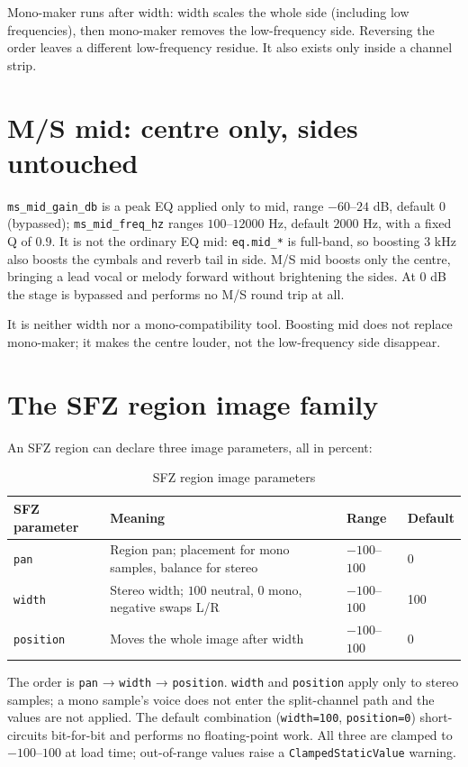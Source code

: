 Mono-maker runs after width: width scales the whole side (including low frequencies), then mono-maker removes the low-frequency side. Reversing the order leaves a different low-frequency residue. It also exists only inside a channel strip.

\section{M/S mid: centre only, sides untouched}

\texttt{ms\_mid\_gain\_db} is a peak EQ applied only to mid, range $-60$--$24$ dB, default $0$ (bypassed); \texttt{ms\_mid\_freq\_hz} ranges $100$--$12000$ Hz, default $2000$ Hz, with a fixed Q of $0.9$. It is not the ordinary EQ mid: \texttt{eq.mid\_*} is full-band, so boosting 3 kHz also boosts the cymbals and reverb tail in side. M/S mid boosts only the centre, bringing a lead vocal or melody forward without brightening the sides. At $0$ dB the stage is bypassed and performs no M/S round trip at all.

It is neither width nor a mono-compatibility tool. Boosting mid does not replace mono-maker; it makes the centre louder, not the low-frequency side disappear.

\section{The SFZ region image family}

An SFZ region can declare three image parameters, all in percent:

\begin{table}[htbp]
\centering
\small
\begin{tabular}{@{}llll@{}}
\hline
SFZ parameter & Meaning & Range & Default \\
\hline
\texttt{pan} & Region pan; placement for mono samples, balance for stereo & $-100$--$100$ & 0 \\
\texttt{width} & Stereo width; $100$ neutral, $0$ mono, negative swaps L/R & $-100$--$100$ & 100 \\
\texttt{position} & Moves the whole image after width & $-100$--$100$ & 0 \\
\hline
\end{tabular}
\caption{SFZ region image parameters}
\label{tab:sfz-pan-family}
\end{table}

The order is \texttt{pan} → \texttt{width} → \texttt{position}. \texttt{width} and \texttt{position} apply only to stereo samples; a mono sample's voice does not enter the split-channel path and the values are not applied. The default combination (\texttt{width=100}, \texttt{position=0}) short-circuits bit-for-bit and performs no floating-point work. All three are clamped to $-100$--$100$ at load time; out-of-range values raise a \texttt{ClampedStaticValue} warning.

